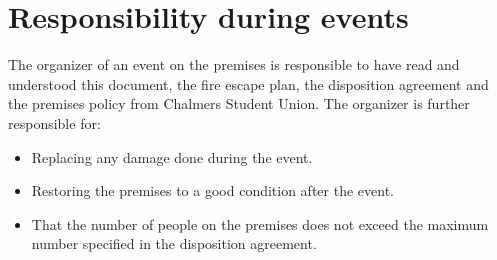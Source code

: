 \documentclass[11pt, includeaddress]{classes/cthit_en}
\begin{document}
\section{Responsibility during events}
The organizer of an event on the premises is responsible to have read and understood this document, the fire escape plan, the disposition agreement and the premises policy from Chalmers Student Union.
The organizer is further responsible for:
\begin{itemize}
    \item Replacing any damage done during the event.
    \item Restoring the premises to a good condition after the event.
    \item That the number of people on the premises does not exceed the maximum number specified in the disposition agreement.
\end{itemize}
\end{document}
